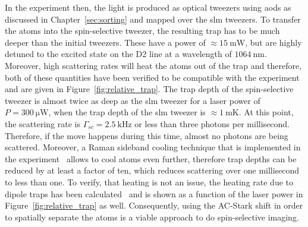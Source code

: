 \begin{figure}[tbp]%
%
\end{figure}%

In the experiment then, the light is produced as optical tweezers using \acp{aod} as discussed in Chapter~\ref{sec:sorting} and mapped over the \ac{slm} tweezers. To transfer the atoms into the spin-selective tweezer, the resulting trap has to be much deeper than the initial tweezers. These have a power of $\approx\SI{15}{\milli\watt}$, but are highly detuned to the excited state on the D2 line at a wavelength of $\SI{1064}{\nano\meter}$. Moreover, high scattering rates will heat the atoms out of the trap and therefore, both of these quantities have been verified to be compatible with the experiment and are given in Figure~\ref{fig:relative_trap}. The trap depth of the spin-selective tweezer is almost twice as deep as the \ac{slm} tweezer for a laser power of $P=\SI{300}{\micro\watt}$, when the trap depth of the \ac{slm} tweezer is $\approx \SI{1}{\milli\kelvin}$. At this point, the scattering rate is $\Gamma_{sc} = \SI{2.5}{\kilo\hertz}$ or less than three photons per millisecond. Therefore, if the move happens during this time, almost no photons are being scattered. Moreover, a Raman sideband cooling technique that is implemented in the experiment~\cite{Thompson2013} allows to cool atoms even further, therefore trap depths can be reduced by at least a factor of ten, which reduces scattering over one millisecond to less than one. To verify, that heating is not an issue, the heating rate due to dipole traps has been calculated~\cite{Grimm2000} and is shown as a function of the laser power in Figure~\ref{fig:relative_trap} as well.
Consequently, using the AC-Stark shift in order to spatially separate the atoms is a viable approach to do spin-selective imaging.

